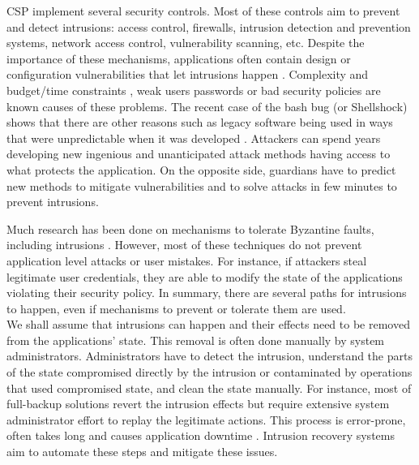 \acf{CSP} implement several security controls. Most of these controls aim to prevent and detect intrusions: access control, firewalls, intrusion detection and prevention systems, network access control, vulnerability scanning, etc. Despite the importance of these mechanisms, applications often contain design or configuration vulnerabilities that let intrusions happen \cite{Williams2013,Hubbard2010}. Complexity and budget/time constraints \cite{Charette2005}, weak users passwords or bad security policies are known causes of these problems. The recent case of the bash bug (or Shellshock) shows that there are other reasons such as legacy software being used in ways that were unpredictable when it was developed \cite{Sidhpurwala:14}. Attackers can spend years developing new ingenious and unanticipated attack methods having access to what protects the application. On the opposite side, guardians have to predict new methods to mitigate vulnerabilities and to solve attacks in few minutes to prevent intrusions.

Much research has been done on mechanisms to tolerate Byzantine faults, including intrusions \cite{Castro2002,Verissimo2003,Gupta:03}. However, most of these techniques do not prevent application level attacks or user mistakes. For instance, if attackers steal legitimate user credentials, they are able to modify the state of the applications violating their security policy. In summary, there are several paths for intrusions to happen, even if mechanisms to prevent or tolerate them are used.\\ %

We shall assume that intrusions can happen and their effects need to be removed from the applications' state. This removal is often done manually by system administrators. Administrators have to detect the intrusion, understand the parts of the state compromised directly by the intrusion or contaminated by operations that used compromised state, and clean the state manually. For instance, most of full-backup solutions revert the intrusion effects but require extensive system administrator effort to replay the legitimate actions. This process is error-prone, often takes long and causes application downtime \cite{Brown2001}. Intrusion recovery systems aim to automate these steps and mitigate these issues.

